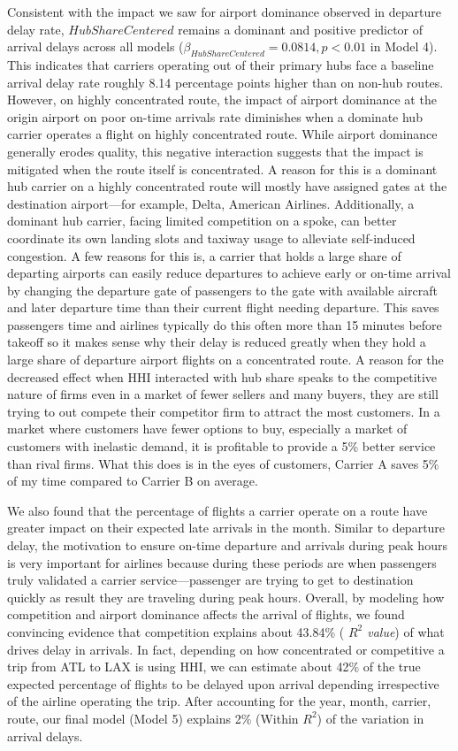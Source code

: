 \documentclass[preprint,12pt,authoryear]{elsarticle}
\begin{document}
Consistent with the impact we saw for airport dominance observed in departure delay rate, $HubShareCentered$ remains a dominant and positive predictor of arrival delays across all models ($\beta_{HubShareCentered} = 0.0814, p < 0.01$ in Model 4). This indicates that carriers operating out of their primary hubs face a baseline arrival delay rate roughly 8.14 percentage points higher than on non-hub routes. However, on highly concentrated route, the impact of airport dominance at the origin airport on poor on-time arrivals rate diminishes when a dominate hub carrier operates a flight on highly concentrated route. While airport dominance generally erodes quality, this negative interaction suggests that the impact is mitigated when the route itself is concentrated. A reason for this is a dominant hub carrier on a highly concentrated route will mostly have assigned gates at the destination airport---for example, Delta, American Airlines. Additionally, a dominant hub carrier, facing limited competition on a spoke, can better coordinate its own landing slots and taxiway usage to alleviate self-induced congestion. A few reasons for this is, a carrier that holds a large share of departing airports can easily reduce departures to achieve early or on-time arrival by changing the departure gate of passengers to the gate with available aircraft and later departure time than their current flight needing departure. This saves passengers time and airlines typically do this often more than 15 minutes before takeoff so it makes sense why their delay is reduced greatly when they hold a large share of departure airport flights on a concentrated route. A reason for the decreased effect when HHI interacted with hub share speaks to the competitive nature of firms even in a market of fewer sellers and many buyers, they are still trying to out compete their competitor firm to attract the most customers. In a market where customers have fewer options to buy, especially a market of customers with inelastic demand, it is profitable to provide a 5\% better service than rival firms. What this does is in the eyes of customers, Carrier A saves 5\% of my time compared to Carrier B on average.

We also found that the percentage of flights a carrier operate on a route have greater impact on their expected late arrivals in the month. Similar to departure delay, the motivation to ensure on-time departure and arrivals during peak hours is very important for airlines because during these periods are when passengers truly validated a carrier service---passenger are trying to get to destination quickly as result they are traveling during peak hours. Overall, by modeling how competition and airport dominance affects the arrival of flights, we found convincing evidence that competition explains about 43.84\% (\textit{ $R^2$ value}) of what drives delay in arrivals. In fact, depending on how concentrated or competitive  a trip from ATL to LAX is using HHI, we can estimate about 42\% of the true expected percentage of flights to be delayed upon arrival depending irrespective of the airline operating the trip. After accounting for the year, month, carrier, route, our final model (Model 5) explains 2\% (Within $R^2$) of the variation in arrival delays.
\end{document}

